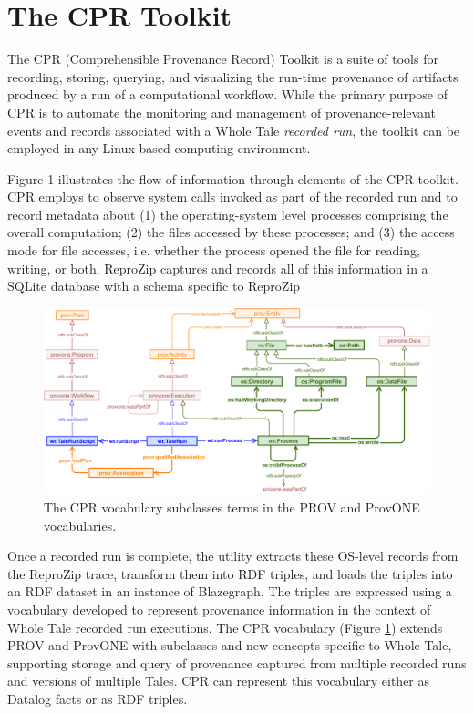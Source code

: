\section{The CPR Toolkit}

The CPR (Comprehensible Provenance Record) Toolkit is a suite of tools for recording, storing, querying, and visualizing the run-time provenance of artifacts produced by a run of a computational workflow. While the primary purpose of CPR  is to automate the monitoring and management of provenance-relevant events and records associated with a Whole Tale \emph{recorded run}, the toolkit can be employed in any Linux-based computing environment.

Figure 1 illustrates the flow of information through elements of the CPR toolkit. CPR employs  to observe system calls invoked as part of the recorded run and to record metadata about (1) the operating-system level processes comprising the overall computation; (2) the files accessed by these processes; and (3) the access mode for file accesses, i.e. whether the process opened the file for reading, writing, or both. ReproZip captures and records all of this information in a SQLite database with a schema specific to ReproZip

\begin{figure}
    \includegraphics[width=\linewidth]{figures/cpr-vocab.pdf}
    \caption{The CPR vocabulary subclasses terms in the PROV and ProvONE vocabularies.}
    \label{fig:cpr-vocab}
\end{figure}

Once a recorded run is complete, the  utility extracts these OS-level records from the ReproZip trace, transform them into RDF triples, and loads the triples into an RDF dataset in an instance of Blazegraph. The triples are expressed using a vocabulary developed to represent provenance information in the context of Whole Tale recorded run executions. The CPR vocabulary (Figure \ref{fig:cpr-vocab}) extends PROV and ProvONE with subclasses and new concepts specific to Whole Tale, supporting storage and query of provenance captured from multiple recorded runs and versions of multiple Tales. CPR can represent this vocabulary either as Datalog facts or as RDF triples.

